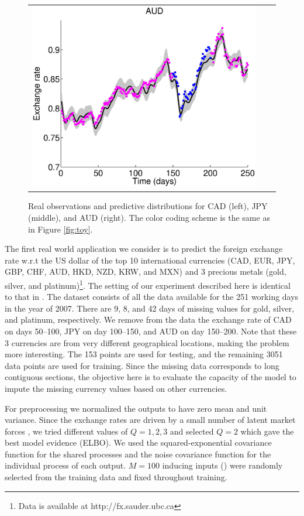 \begin{figure}
\begin{tabular}{ccc}
\includegraphics[scale=0.28]{figures/fxAUD.eps}
\end{tabular}
\caption{Real observations and predictive distributions for CAD (left), JPY (middle), and AUD (right). The color coding scheme is the same as in Figure \ref{fig:toy}.}
\label{fig:fx}
\end{figure}

The first real world application we consider is to predict the foreign exchange rate w.r.t the US dollar of the top 10 international currencies (CAD, EUR, JPY, GBP, CHF, AUD, HKD, NZD, KRW, and MXN) and 3 precious metals (gold, silver, and platinum)\footnote{Data is available at http://fx.sauder.ubc.ca}. 
The setting of our experiment described here is identical to that in \citep{alvarez2010efficient}.
The dataset consists of all the data available for the 251 working days in the year of 2007.
There are 9, 8, and 42 days of missing values  for gold, silver, and platinum, respectively.
We remove from the data the exchange rate of CAD on days 50--100, JPY on day 100--150, and AUD on day 150--200.
Note that these 3 currencies are from very different geographical locations, making the problem more interesting. 
The 153 points are used for testing, and the remaining 3051 data points are used for training.
Since the missing data corresponds to long contiguous sections, the objective here is to evaluate the capacity of the model to impute the missing currency values based on other currencies.

For preprocessing we normalized the outputs to have zero mean and unit variance.
Since the exchange rates are driven by a small number of latent market forces \citep[see e.g.][]{alvarez2010efficient}, we tried different values of $Q = {1,2,3}$ and selected $Q = 2$ which gave the best model evidence (ELBO).
We used the squared-exponential covariance function for the shared processes and the noise covariance function for the individual process of each output.
$M = 100$ inducing inputs () were randomly selected from the training data and fixed throughout training.

